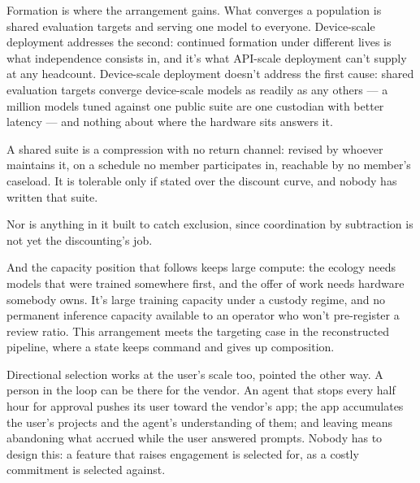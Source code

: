 
Formation is where the arrangement gains. What converges a population is shared evaluation targets and serving one model to everyone. Device-scale deployment addresses the second: continued formation under different lives is what independence consists in, and it's what API-scale deployment can't supply at any headcount.
Device-scale deployment doesn't address the first cause: shared evaluation targets converge device-scale models as readily as any others — a million models tuned against one public suite are one custodian with better latency — and nothing about where the hardware sits answers it.

A shared suite is a compression with no return channel: revised by whoever maintains it, on a schedule no member participates in, reachable by no member's caseload. It is tolerable only if stated over the discount curve, and nobody has written that suite.

Nor is anything in it built to catch exclusion, since coordination by subtraction is not yet the discounting's job.

And the capacity position that follows keeps large compute: the ecology needs models that were trained somewhere first, and the offer of work needs hardware somebody owns. It's large training capacity under a custody regime, and no permanent inference capacity available to an operator who won't pre-register a review ratio. This arrangement meets the targeting case in the reconstructed pipeline, where a state keeps command and gives up composition.


Directional selection works at the user's scale too, pointed the other way. A person in the loop can be there for the vendor. An agent that stops every half hour for approval pushes its user toward the vendor's app; the app accumulates the user's projects and the agent's understanding of them; and leaving means abandoning what accrued while the user answered prompts. Nobody has to design this: a feature that raises engagement is selected for, as a costly commitment is selected against.

